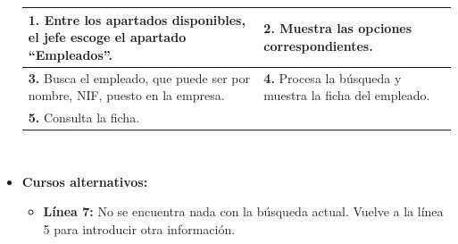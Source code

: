 \documentclass[spanish,a4paper,11pt, twoside]{report}	%
\begin{document}
\begin{itemize}
\begin{tabular}{|p{6cm}||p{6cm}|}
				\textbf{1.} Entre los apartados disponibles, el jefe escoge el apartado
						``Empleados''. & \textbf{2.} Muestra las opciones correspondientes. \\ \hline
				\textbf{3.} Busca el empleado, que puede ser por nombre, NIF, puesto en la
						empresa. & \textbf{4.} Procesa la búsqueda y muestra la ficha del empleado. \\
				\hline \textbf{5.} Consulta la ficha.  & \textbf{} \\ \hline
			\end{tabular}
			\\
			\item \textbf{Cursos alternativos:} 
			\begin{itemize}
			\item  \textbf{Línea 7:} No se encuentra nada con la búsqueda actual. Vuelve a la línea 5 para introducir otra información.
			\end {itemize}
		\end{itemize}

\end{document}
